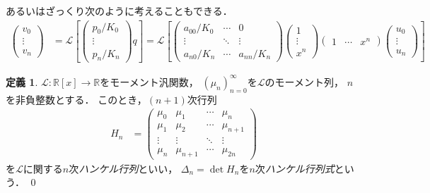 \documentclass{jlreq}
\theoremstyle{definition}
\newtheorem{definition}[theorem]{定義}
\newcommand{\functype}[3]{#1\colon#2\longrightarrow#3}
\newcommand{\mcL}{\mathcal{L}}
\newcommand{\polynoms}[2]{#1[#2]}
\newcommand{\realnums}{\mathbb{R}}
\newcommand{\sequence}[3]{\sequenceparen{#1}{#2}{#3}{(}{)}} %
\newcommand{\sequenceparen}[5]{{#4#1#5}_{#2}^{#3}}
\begin{document}
あるいはざっくり次のように考えることもできる．
\begin{align}
  \begin{pmatrix}
    v_0 \\ \vdots \\ v_n
  \end{pmatrix}
  &=\mcL \left[
      \begin{pmatrix}
        p_0/K_0 \\ \vdots \\ p_n/K_n
      \end{pmatrix}
      q
    \right]
  =\mcL \left[
    \begin{pmatrix}
      a_{00}/K_0 & \cdots & 0 \\
      \vdots & \ddots & \vdots \\
      a_{n0}/K_n & \cdots & a_{nn}/K_n
    \end{pmatrix}
      \begin{pmatrix}
        1 \\ \vdots \\ x^n
      \end{pmatrix}
      \begin{pmatrix}
        1 & \cdots & x^n
      \end{pmatrix}
      \begin{pmatrix}
        u_0 \\ \vdots \\ u_n
      \end{pmatrix}
    \right]
\end{align}

\begin{definition}
  \(\functype{\mcL}{\polynoms{\realnums}{x}}{\realnums}\)をモーメント汎関数，
  \(\sequence{\mu_n}{n=0}{\infty}\)を\(\mcL\)のモーメント列，
  \(n\)を非負整数とする．
  このとき，\((n+1)\)次行列
  \begin{align}
    H_n
    &=
    \begin{pmatrix}
      \mu_0 & \mu_1 & \cdots & \mu_n \\
      \mu_1 & \mu_2 & \cdots & \mu_{n+1} \\
      \vdots & \vdots & \ddots & \vdots \\
      \mu_n & \mu_{n+1} & \cdots & \mu_{2n}
    \end{pmatrix}
  \end{align}
  を\(\mcL\)に関する\(n\)次\emph{ハンケル行列}といい，
  \(\Delta_n=\det H_n\)を\(n\)次\emph{ハンケル行列式}という．
  \qed
\end{definition}
\end{document}
